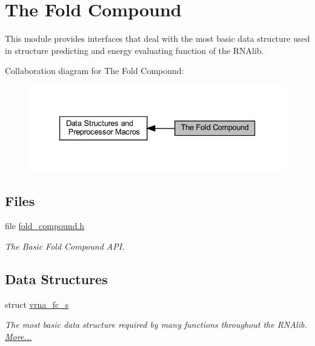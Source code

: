 \hypertarget{group__fold__compound}{}\section{The Fold Compound}
\label{group__fold__compound}


This module provides interfaces that deal with the most basic data structure used in structure predicting and energy evaluating function of the R\+N\+Alib.  


Collaboration diagram for The Fold Compound\+:
\nopagebreak
\begin{figure}[H]
\begin{center}
\leavevmode
\includegraphics[width=333pt]{group__fold__compound}
\end{center}
\end{figure}
\subsection*{Files}
\begin{DoxyCompactItemize}
\item 
file \hyperlink{fold__compound_8h}{fold\+\_\+compound.\+h}
\begin{DoxyCompactList}\small\item\em The Basic Fold Compound A\+PI. \end{DoxyCompactList}\end{DoxyCompactItemize}
\subsection*{Data Structures}
\begin{DoxyCompactItemize}
\item 
struct \hyperlink{group__fold__compound_structvrna__fc__s}{vrna\+\_\+fc\+\_\+s}
\begin{DoxyCompactList}\small\item\em The most basic data structure required by many functions throughout the R\+N\+Alib.  \hyperlink{group__fold__compound_structvrna__fc__s}{More...}\end{DoxyCompactList}\end{DoxyCompactItemize}
